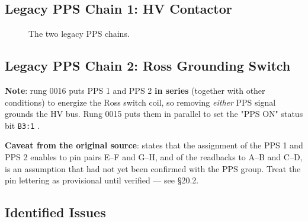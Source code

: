 \subsection{Legacy PPS Chain 1: HV Contactor}

\begin{figure}[tbp]\centering
\begin{fitpicture}\end{fitpicture}
\caption{The two legacy PPS chains.}\label{fig:pps-chains}
\end{figure}

\subsection{Legacy PPS Chain 2: Ross Grounding Switch}

\begin{keynote}
\textbf{Note}: rung 0016 puts PPS 1 and PPS 2 \textbf{in series} (together with other conditions) to energize the Ross switch coil, so removing \emph{either} PPS signal grounds the HV bus. Rung 0015 puts them in parallel to set the "PPS ON" status bit \texttt{B3:1} .
\end{keynote}

\begin{keynote}
\textbf{Caveat from the original source}:  states that the assignment of the PPS 1 and PPS 2 enables to pin pairs E--F and G--H, and of the readbacks to A--B and C--D, is an assumption that had not yet been confirmed with the PPS group. Treat the pin lettering as provisional until verified --- see §20.2.
\end{keynote}

\subsection{Identified Issues}

